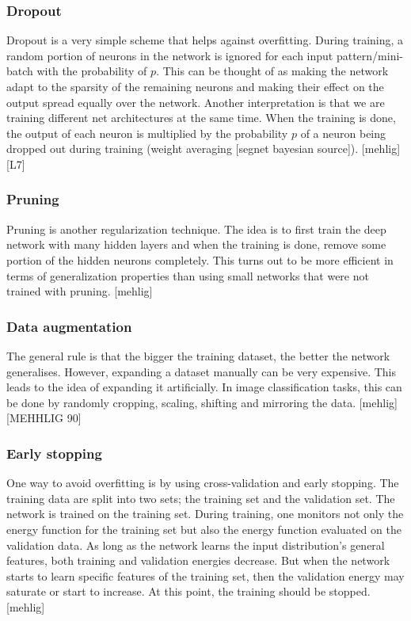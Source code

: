 \subsubsection{Dropout}

Dropout is a very simple scheme that helps against overfitting. During training, a random portion of neurons in the network is ignored for each input pattern/mini-batch with the probability of $ p $. This can be thought of as making the network adapt to the sparsity of the remaining neurons and making their effect on the output spread equally over the network. Another interpretation is that we are training different net architectures at the same time. When the training is done, the output of each neuron is multiplied by the probability $ p $ of a neuron being dropped out during training (weight averaging [segnet bayesian source]).  [mehlig][L7]

\subsubsection{Pruning}

Pruning is another regularization technique. The idea is to first train the deep network with many hidden layers and when the training is done, remove some portion of the hidden neurons completely. This turns out to be more efficient in terms of generalization properties than using small networks that were not trained with pruning. [mehlig]

\subsubsection{Data augmentation}

The general rule is that the bigger the training dataset, the better the network generalises. However, expanding a dataset manually can be very expensive. This leads to the idea of expanding it artificially. In image classification tasks, this can be done by randomly cropping, scaling, shifting and mirroring the data. [mehlig]
[MEHHLIG 90]

\subsubsection{Early stopping}
One way to avoid overfitting is by using cross-validation and early stopping. The training data are split into two sets; the training set and the validation set. The network is trained on the training set. During training, one monitors not only the energy function for the training set but also the energy function evaluated on the validation data. As long as the network learns the input distribution's general features, both training and validation energies decrease. But when the network starts to learn specific features of the training set, then the validation energy may saturate or start to increase. At this point, the training should be stopped. [mehlig]

